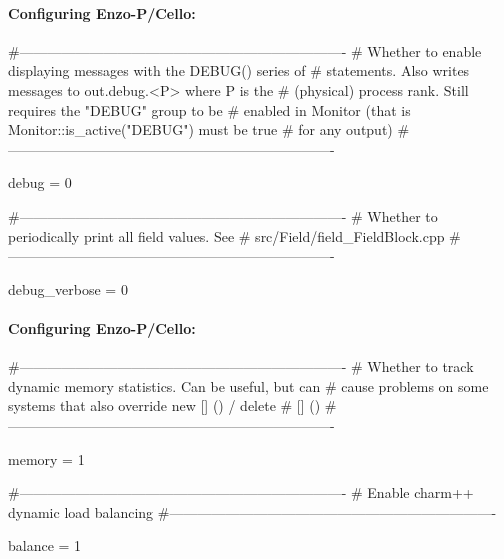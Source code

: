 \begin{frame}[fragile] 
\secframetitle{\ssConfigure}
\framesubtitle{Configuring Enzo-P/Cello: }
\tiny
\begin{semiverbatim}

#----------------------------------------------------------------------
# Whether to enable displaying messages with the DEBUG() series of
# statements. Also writes messages to out.debug.<P> where P is the
# (physical) process rank. Still requires the "DEBUG" group to be
# enabled in Monitor (that is Monitor::is_active("DEBUG") must be true
# for any output)
#----------------------------------------------------------------------

debug = 0

#----------------------------------------------------------------------
# Whether to periodically print all field values.  See
# src/Field/field_FieldBlock.cpp
#----------------------------------------------------------------------

debug_verbose = 0

\end{semiverbatim}
\end{frame}

\begin{frame}[fragile] 
\secframetitle{\ssConfigure}
\framesubtitle{Configuring Enzo-P/Cello: }
\tiny
\begin{semiverbatim}

#----------------------------------------------------------------------
# Whether to track dynamic memory statistics.  Can be useful, but can
# cause problems on some systems that also override new [] () / delete
# [] ()
#----------------------------------------------------------------------

memory = 1

#----------------------------------------------------------------------
# Enable charm++ dynamic load balancing
#----------------------------------------------------------------------

balance = 1

\end{semiverbatim}
\end{frame}


